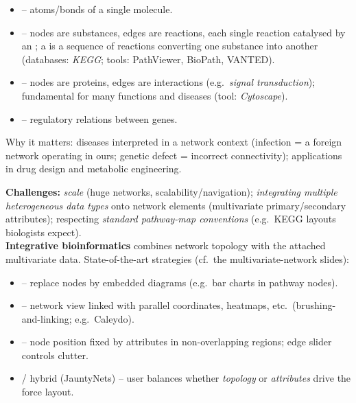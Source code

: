\begin{keybox}
\begin{itemize}
  \item {} -- atoms/bonds of a single molecule.
  \item {} -- nodes are substances, edges are
  reactions, each single reaction catalysed by an ; a 
  is a sequence of reactions converting one substance into another (databases:
  \emph{KEGG}; tools: PathViewer, BioPath, VANTED).
  \item {} -- nodes are proteins,
  edges are interactions (e.g.\ \emph{signal transduction}); fundamental for many
  functions and diseases (tool: \emph{Cytoscape}).
  \item {} -- regulatory relations between genes.
\end{itemize}
Why it matters: diseases interpreted in a network context (infection = a foreign
network operating in ours; genetic defect = incorrect connectivity);
applications in drug design and metabolic engineering.
\end{keybox}

\begin{keybox}
\textbf{Challenges:} \emph{scale} (huge networks, scalability/navigation);
\emph{integrating multiple heterogeneous data types} onto network elements
(multivariate primary/secondary attributes); respecting \emph{standard pathway-map
conventions} (e.g.\ KEGG layouts biologists expect).\\
\textbf{Integrative bioinformatics} combines network topology with the attached
multivariate data. State-of-the-art strategies (cf.\ the multivariate-network
slides):
\begin{itemize}
  \item {} -- replace nodes by embedded diagrams
  (e.g.\ bar charts in pathway nodes).
  \item {} -- network view linked with parallel
  coordinates, heatmaps, etc.\ (brushing-and-linking; e.g.\ Caleydo).
  \item {} -- node position fixed by attributes in
  non-overlapping regions; edge slider controls clutter.
  \item {} / hybrid (JauntyNets) -- user balances
  whether \emph{topology} or \emph{attributes} drive the force layout.
\end{itemize}
\end{keybox}


